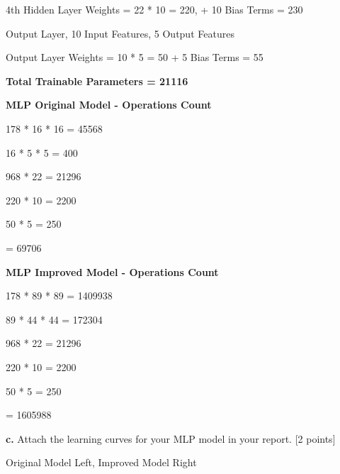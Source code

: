 \documentclass[12pt]{article}
\begin{document}
4th Hidden Layer Weights = 22 * 10 = 220, + 10 Bias Terms = 230

Output Layer, 10 Input Features, 5 Output Features

Output Layer Weights = 10 * 5 = 50 + 5 Bias Terms = 55

\textbf{Total Trainable Parameters = 21116}

\bigskip

\textbf{MLP Original Model - Operations Count}

178 * 16 * 16 = 45568

16 * 5 * 5 = 400

968 * 22 = 21296

220 * 10 = 2200

50 * 5  = 250

= 69706

\bigskip

\textbf{MLP Improved Model - Operations Count}

178 * 89 * 89 = 1409938

89 * 44 * 44 = 172304

968 * 22 = 21296

220 * 10 = 2200

50 * 5  = 250

= 1605988



\bigskip

\textbf{c.} Attach the learning curves for your MLP model in your report. [2 points]

\bigskip

Original Model Left, Improved Model Right

\bigskip
\end{document}
